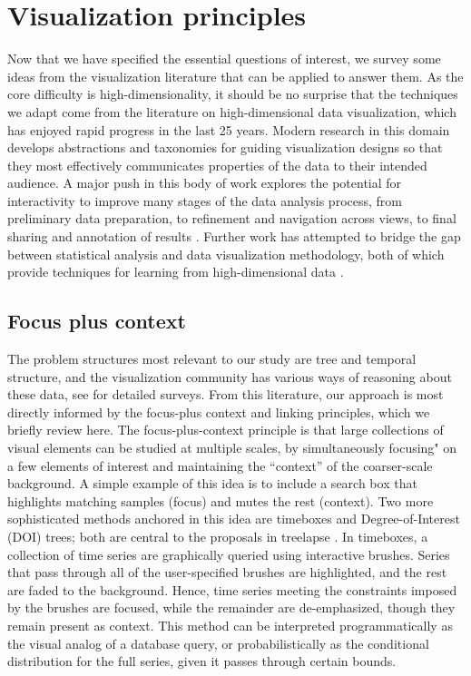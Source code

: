 \documentclass{report}
\begin{document}
\section{Visualization principles}

Now that we have specified the essential questions of interest, we survey some
ideas from the visualization literature that can be applied to answer them. As
the core difficulty is high-dimensionality, it should be no surprise that the
techniques we adapt come from the literature on high-dimensional data
visualization, which has enjoyed rapid progress in the last 25 years. Modern
research in this domain develops abstractions and taxonomies for guiding
visualization designs so that they most effectively communicates properties of
the data to their intended audience. A major push in this body of work explores
the potential for interactivity to improve many stages of the data analysis
process, from preliminary data preparation, to refinement and navigation across
views, to final sharing and annotation of results \citep{heer2012taxonomy}.
Further work has attempted to bridge the gap between statistical analysis and
data visualization methodology, both of which provide techniques for learning
from high-dimensional data \citep{de2003visual}.

\subsection{Focus plus context}

The problem structures most relevant to our study are tree and temporal
structure, and the visualization community has various ways of reasoning about
these data, see \citep{graham2010survey, aigner2011visualization} for detailed
surveys. From this literature, our approach is most directly informed by the
focus-plus context and linking principles, which we briefly review here. The
focus-plus-context principle is that large collections of visual elements can be
studied at multiple scales, by simultaneously focusing" on a few elements of
interest and maintaining the ``context'' of the coarser-scale background. A
simple example of this idea is to include a search box that highlights matching
samples (focus) and mutes the rest (context). Two more sophisticated methods
anchored in this idea are timeboxes and Degree-of-Interest (DOI) trees; both are
central to the proposals in treelapse \citep{hochheiser2004dynamic,
  heer2004doitrees}. In timeboxes, a collection of time series are graphically
queried using interactive brushes. Series that pass through all of the
user-specified brushes are highlighted, and the rest are faded to the
background. Hence, time series meeting the constraints imposed by the brushes
are focused, while the remainder are de-emphasized, though they remain present
as context. This method can be interpreted programmatically as the visual analog
of a database query, or probabilistically as the conditional distribution for
the full series, given it passes through certain bounds.
\end{document}
